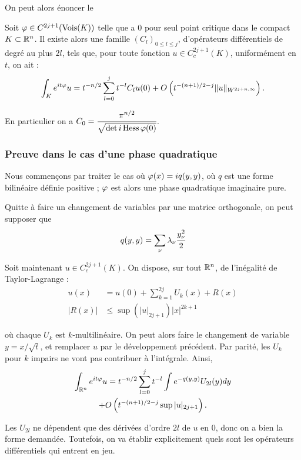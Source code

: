  On peut alors énoncer le 
\begin{theorem}\label{th:phasestat}Soit $\varphi \in C^{2j+1}(\operatorname{Vois}(K))$ telle que a $0$ pour seul point critique dans le compact $K \subset \mathbb{R}^n$.
Il existe alors une famille $(C_l)_{0 \leq l \leq j}$, d'opérateurs différentiels de degré au plus $2l$, tels que, pour toute fonction $u\in C_c^{2j+1}(K)$, uniformément en $t$, on ait :
\begin{equation*}
  \int_Ke^{it\varphi}u = t^{-n/2}\sum_{l=0}^{j}t^{-l}C_lu(0) + O\left(t^{-(n+1)/2-j}\|u\|_{W^{2j+n,\infty}}\right).
\end{equation*}

En particulier on a $C_0 = \cfrac{\pi^{n/2}}{\sqrt{\det i\operatorname{Hess}{\varphi}(0)}}$.
\end{theorem}

\subsubsection{Preuve dans le cas d'une phase quadratique}
Nous commençons par traiter le cas où $\varphi(x)=iq(y,y)$, où $q$ est une forme bilinéaire définie positive ; $\varphi$ est alors une phase quadratique imaginaire pure.

Quitte à faire un changement de variables par une matrice orthogonale, on peut supposer que 
\begin{equation*}
  q(y,y)=\sum_{\nu}\lambda_{\nu}\cfrac{y_{\nu}^2}{2}
\end{equation*}

Soit maintenant $u\in C_c^{2j+1}(K)$. On dispose, sur tout $\mathbb{R}^n$, de l'inégalité de Taylor-Lagrange :
\begin{align*}
  u(x)&=u(0) + \sum_{k=1}^{2j}U_k(x)+R(x)\\
  |R(x)| &\leq \sup(|u|_{2j+1})|x|^{2k+1}
\end{align*}

\noindent où chaque $U_k$ est $k$-multilinéaire. On peut alors faire le changement de variable $y = x/\sqrt{t}$, et remplacer $u$ par le développement précédent. Par parité, les $U_k$ pour $k$ impairs ne vont pas contribuer à l'intégrale. Ainsi,
\begin{multline*}
  \int_{\mathbb{R}^n}e^{it\varphi}u = t^{-n/2}\sum_{l=0}^{j}t^{-l}\int e^{-q(y,y)}U_{2l}(y)dy \\+ O\left(t^{-(n+1)/2-j}\sup |u|_{2j+1}\right).
\end{multline*}

Les $U_{2l}$ ne dépendent que des dérivées d'ordre $2l$ de $u$ en $0$, donc on a bien la forme demandée. Toutefois, on va établir explicitement quels sont les opérateurs différentiels qui entrent en jeu.

